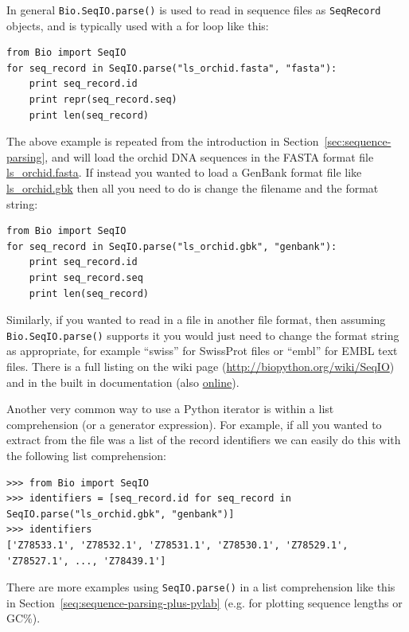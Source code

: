 \documentclass{report}
\begin{document}
In general \verb|Bio.SeqIO.parse()| is used to read in sequence files as \verb|SeqRecord| objects, and is typically used with a for loop like this:

\begin{verbatim}
from Bio import SeqIO
for seq_record in SeqIO.parse("ls_orchid.fasta", "fasta"):
    print seq_record.id
    print repr(seq_record.seq)
    print len(seq_record)
\end{verbatim}

The above example is repeated from the introduction in Section~\ref{sec:sequence-parsing}, and will load the orchid DNA sequences in the FASTA format file \href{http://biopython.org/DIST/docs/tutorial/examples/ls_orchid.fasta}{ls\_orchid.fasta}.  If instead you wanted to load a GenBank format file like \href{http://biopython.org/DIST/docs/tutorial/examples/ls_orchid.gbk}{ls\_orchid.gbk} then all you need to do is change the filename and the format string:

\begin{verbatim}
from Bio import SeqIO
for seq_record in SeqIO.parse("ls_orchid.gbk", "genbank"):
    print seq_record.id
    print seq_record.seq
    print len(seq_record)
\end{verbatim}

Similarly, if you wanted to read in a file in another file format, then assuming \verb|Bio.SeqIO.parse()| supports it you would just need to change the format string as appropriate, for example ``swiss'' for SwissProt files or ``embl'' for EMBL text files. There is a full listing on the wiki page (\url{http://biopython.org/wiki/SeqIO}) and in the built in documentation (also \href{http://biopython.org/DIST/docs/api/Bio.SeqIO-module.html}{online}).

Another very common way to use a Python iterator is within a list comprehension (or
a generator expression).  For example, if all you wanted to extract from the file was
a list of the record identifiers we can easily do this with the following list comprehension:

\begin{verbatim}
>>> from Bio import SeqIO
>>> identifiers = [seq_record.id for seq_record in SeqIO.parse("ls_orchid.gbk", "genbank")]
>>> identifiers
['Z78533.1', 'Z78532.1', 'Z78531.1', 'Z78530.1', 'Z78529.1', 'Z78527.1', ..., 'Z78439.1']
\end{verbatim}

\noindent There are more examples using \verb|SeqIO.parse()| in a list
comprehension like this in Section~\ref{seq:sequence-parsing-plus-pylab}
(e.g. for plotting sequence lengths or GC\%).
\end{document}
